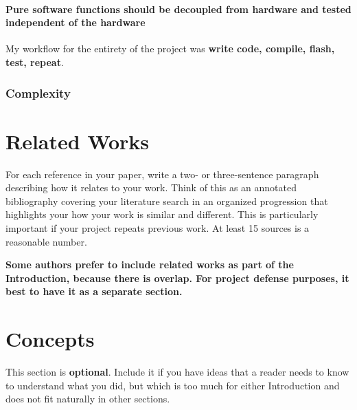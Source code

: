 \documentclass[acmlarge,screen]{acmart}
\begin{document}
	\paragraph{Pure software functions should be decoupled from hardware and tested independent of the hardware} My workflow for the entirety of the project was \textbf{write code, compile, flash, test, repeat}. 
	
	
	
	\subsubsection{Complexity}
	

\section{Related Works}
For each reference in your paper, write a two- or three-sentence paragraph 
describing how it relates to your work. Think of this as an annotated bibliography
covering your literature search in an organized progression that highlights your 
how your work is similar and different. This is particularly important if your project repeats
previous work. At least 15 sources is a reasonable number.

\textbf{Some authors prefer to include related works as part of the Introduction, because there
is overlap. For project defense purposes, it best to have it as a separate section.}

\section{Concepts}
This section is \textbf{optional}. Include it if you have ideas that a reader needs to know to
understand what you did, but which is too much for either Introduction and does not
fit naturally in other sections.
\end{document}
